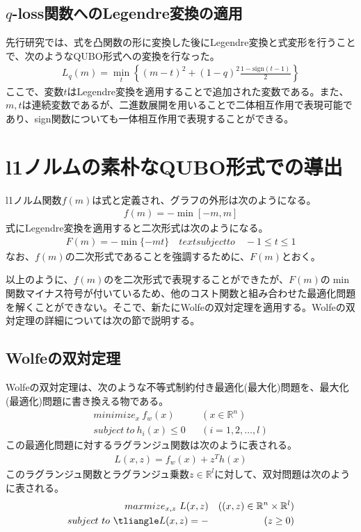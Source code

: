 \documentclass[paper]{ieicej}
\begin{document}
\subsection{$q$-loss関数へのLegendre変換の適用}
先行研究では、式を凸関数の形に変換した後にLegendre変換と式変形を行うことで、次のようなQUBO形式への変換を行なった。
\begin{eqnarray}
 L_{q}(m) = \min_{t}{\left\{(m-t)^{2}+(1-q)^{2}\frac{1-\mathrm{sign}(t-1)}{2}\right\}}
\end{eqnarray}
ここで、変数$t$はLegendre変換を適用することで追加された変数である。また、$m,t$は連続変数であるが、二進数展開を用いることで二体相互作用で表現可能であり、sign関数についても一体相互作用で表現することができる。

\section{l1ノルムの素朴なQUBO形式での導出}
l1ノルム関数$f(m)$は式と定義され、グラフの外形は次のようになる。
\begin{eqnarray}
 f(m) = -\min{[-m,m]}
\end{eqnarray}
式にLegendre変換を適用すると二次形式は次のようになる。
\begin{eqnarray}
 F(m) = -\min{\{-mt\}} \quad text{subject to} \quad -1\leq t\leq 1
\end{eqnarray}
なお、$f(m)$の二次形式であることを強調するために、$F(m)$とおく。

以上のように、$f(m)$のを二次形式で表現することができたが、$F(m)$の$\min$関数マイナス符号が付いているため、他のコスト関数と組み合わせた最適化問題を解くことができない。そこで、新たにWolfeの双対定理を適用する。Wolfeの双対定理の詳細については次の節で説明する。
\subsection{Wolfeの双対定理}
Wolfeの双対定理は、次のような不等式制約付き最適化(最大化)問題を、最大化(最適化)問題に書き換える物である。
\begin{eqnarray}
 minimize_{x} \ f_{w}(x) & & (x\in\mathbb{R}^{n}) \nonumber \\
 subject \ to \ h_{i}(x) \leq 0 & & (i=1,2,\dots,l)
\end{eqnarray}
この最適化問題に対するラグランジュ関数は次のように表される。
\begin{eqnarray}
 L(x,z) = f_{w}(x)+z^{T}h(x)
\end{eqnarray}
このラグランジュ関数とラグランジュ乗数$z\in\mathbb{R}^{l}$に対して、双対問題は次のように表される。
\begin{eqnarray}
 maxmize_{x,z} \ L(x,z) & & ((x,z)\in\mathbb{R}^{n}\times\mathbb{R}^{l}) \nonumber \\
 subject \ to \ \tliangle L(x,z) = - & & (z\geq 0)
\end{eqnarray}
\end{document}
